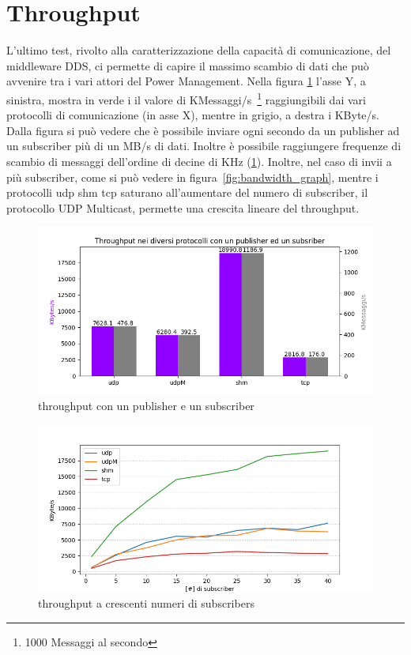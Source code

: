 \section{Throughput} %
L'ultimo test, rivolto alla caratterizzazione della capacità di comunicazione, del middleware DDS, ci permette di capire il massimo scambio di dati che può avvenire tra i vari attori del Power Management. Nella figura \ref{fig:throughput_combined} l'asse Y, a sinistra, mostra in verde i il valore di KMessaggi/s~\footnote{1000 Messaggi al secondo} raggiungibili dai vari protocolli di comunicazione (in asse X), mentre in grigio, a destra i KByte/s. Dalla figura si può vedere che è possibile inviare ogni secondo da un publisher ad un subscriber più di un MB/s di dati. Inoltre è possibile raggiungere frequenze di scambio di messaggi dell'ordine di decine di KHz (\ref{fig:throughput_combined}). Inoltre, nel caso di invii a più subscriber, come si può vedere in figura~\ref{fig:bandwidth_graph}, mentre i protocolli udp shm tcp saturano all'aumentare del numero di subscriber, il protocollo UDP Multicast, permette una crescita lineare del throughput.

\begin{figure}[H]
    \includegraphics[width=\textwidth]{./results/test3_throughput_combined.png} 
        \caption{throughput con un publisher e un subscriber}\label{fig:throughput_combined}
\end{figure}

\begin{figure}[H]
    \includegraphics[width=\textwidth]{./results/test3_graph_throughput.png} 
    \caption{throughput a crescenti numeri di subscribers}\label{fig:throughput_increasing}
\end{figure}

